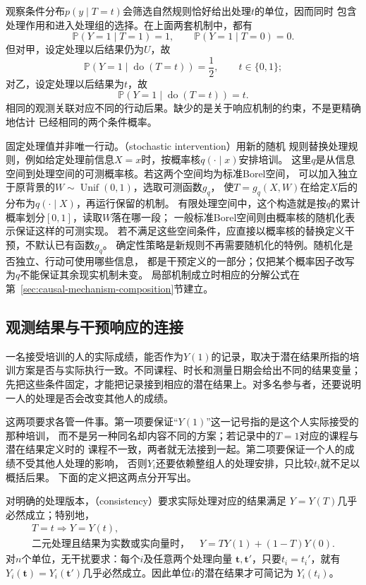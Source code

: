 观察条件分布\(p(y\mid T=t)\)会筛选自然规则恰好给出处理\(t\)的单位，因而同时
包含处理作用和进入处理组的选择。在上面两套机制中，都有
\[
  \mathbb P(Y=1\mid T=1)=1,\qquad
  \mathbb P(Y=1\mid T=0)=0.
\]
但对甲，设定处理以后结果仍为\(U\)，故
\[
  \mathbb P(Y=1\mid\operatorname{do}(T=t))=\frac12,
  \qquad t\in\{0,1\};
\]
对乙，设定处理以后结果为\(t\)，故
\[
  \mathbb P(Y=1\mid\operatorname{do}(T=t))=t.
\]
相同的观测关联对应不同的行动后果。缺少的是关于响应机制的约束，不是更精确地估计
已经相同的两个条件概率。

固定处理值并非唯一行动。（stochastic intervention）用新的随机
规则替换处理规则，例如给定处理前信息\(X=x\)时，按概率核\(q(\cdot\mid x)\)安排培训。
这里\(q\)是从信息空间到处理空间的可测概率核。若这两个空间均为标准Borel空间，
可以加入独立于原背景的\(W\sim\operatorname{Unif}(0,1)\)，选取可测函数\(g_q\)，
使\(T=g_q(X,W)\)在给定\(X\)后的分布为\(q(\cdot\mid X)\)，再运行保留的机制。
有限处理空间中，这个构造就是按\(q\)的累计概率划分\([0,1]\)，读取\(W\)落在哪一段；
一般标准Borel空间则由概率核的随机化表示保证这样的可测实现。
若不满足这些空间条件，应直接以概率核的替换定义干预，不默认已有函数\(g_q\)。
确定性策略是新规则不再需要随机化的特例。随机化是否独立、行动可使用哪些信息，
都是干预定义的一部分；仅把某个概率因子改写为\(q\)不能保证其余现实机制未变。
局部机制成立时相应的分解公式在第~\ref{sec:causal-mechanism-composition}节建立。

\subsection{观测结果与干预响应的连接}
\label{sec:causal-response-observation-link}

一名接受培训的人的实际成绩，能否作为\(Y(1)\)的记录，取决于潜在结果所指的培训方案是否与实际执行一致。不同课程、时长和测量日期会给出不同的结果变量；先把这些条件固定，才能把记录接到相应的潜在结果上。对多名参与者，还要说明一人的处理是否会改变其他人的成绩。

这两项要求各管一件事。第一项要保证“\(Y(1)\)”这一记号指的是这个人实际接受的那种培训，
而不是另一种同名却内容不同的方案；若记录中的\(T=1\)对应的课程与潜在结果定义时的
课程不一致，两者就无法接到一起。第二项要保证一个人的成绩不受其他人处理的影响，
否则\(Y_i\)还要依赖整组人的处理安排，只比较\(t_i\)就不足以概括后果。
下面的定义把这两点分开写出。

\begin{definition}[处理一致性与无干扰]
  \label{def:causal-consistency-no-interference}
  对明确的处理版本，（consistency）要求实际处理对应的结果满足
  \(Y=Y(T)\)几乎必然成立；特别地，
  \begin{equation}
    \begin{gathered}
      T=t\Longrightarrow Y=Y(t),\\
      \text{二元处理且结果为实数或实向量时，}\quad Y=TY(1)+(1-T)Y(0).
    \end{gathered}
    \label{eq:causal-consistency}
  \end{equation}
  对\(n\)个单位，无干扰要求：每个\(i\)及任意两个处理向量
  \(\bm t,\bm t'\)，只要\(t_i=t_i'\)，就有
  \(Y_i(\bm t)=Y_i(\bm t')\)几乎必然成立。因此单位\(i\)的潜在结果才可简记为
  \(Y_i(t_i)\)。
\end{definition}

